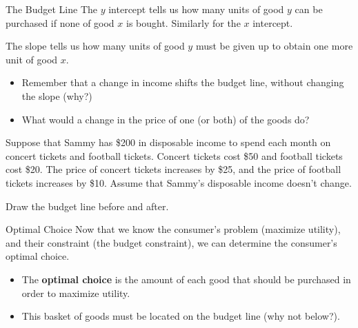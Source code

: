 \documentclass[12pt,t]{beamer}
\begin{document}
\begin{frame}{The Budget Line}
  The $y$ intercept tells us how many units of good $y$ can be purchased if none of good $x$ is bought. Similarly for the $x$ intercept.
  
  \pause\bigskip
  The slope tells us how many units of good $y$ must be given up to obtain one more unit of good $x$.

  \pause\bigskip
  \begin{itemize}
    \item Remember that a change in income shifts the budget line, without changing the slope (why?)
    
    \item What would a change in the price of one (or both) of the goods do?
  \end{itemize}
\end{frame}

\begin{frame}
  
  \bigskip
  Suppose that Sammy has \$200 in disposable income to spend each month on concert tickets and football tickets. Concert tickets cost \$50 and football tickets cost \$20. The price of concert tickets increases by \$25, and the price of football tickets increases by \$10. Assume that Sammy's disposable income doesn't change. 
  
  \bigskip
  Draw the budget line before and after. 
\end{frame}

\begin{frame}{Optimal Choice}
  Now that we know the consumer's problem (maximize utility), and their constraint (the budget constraint), we can determine the consumer's optimal choice.
  \begin{itemize}
    \item The \textbf{optimal choice} is the amount of each good that should be purchased in order to maximize utility.

    \item This basket of goods must be located on the budget line (why not below?).
  \end{itemize}
\end{frame}
\end{document}

